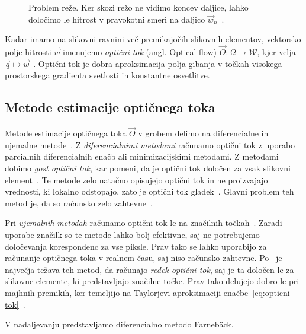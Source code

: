 \begin{figure}[htb]
\centering

\caption[Problem reže]{Problem reže. Ker skozi režo ne vidimo koncev daljice, lahko določimo le hitrost v pravokotni smeri na daljico $\vec{w}_n$~\cite{trucco1998introductory}.}
\label{fig:aperture-problem}
\end{figure}




Kadar imamo na slikovni ravnini več premikajočih slikovnih elementov, vektorsko polje hitrosti $\vec{w}$ imenujemo \emph{optični tok} (angl. Optical flow) $\vec{O}: \varOmega \to \mathcal{W}$, kjer velja $ \vec{q} \mapsto \vec{w}$~\cite{trucco1998introductory}. Optični tok je dobra aproksimacija polja gibanja v točkah visokega prostorskega gradienta svetlosti in konstantne osvetlitve.



\subsection{Metode estimacije optičnega toka}\label{sec:metode-of}

Metode estimacije optičnega toka $\vec{O}$ v grobem delimo na diferencialne in {ujemalne} metode~\cite{trucco1998introductory}. Z \emph{diferencialnimi metodami} računamo optični tok z uporabo parcialnih diferencialnih enačb ali minimizacijskimi metodami. Z metodami dobimo \emph{gost optični tok}, kar pomeni, da je optični tok določen za vsak slikovni element~\cite{trucco1998introductory}. Te metode zelo natačno opisujejo optični tok in ne proizvajajo vrednosti, ki lokalno odstopajo, zato je optični tok gladek~\cite{brox2011large}.  Glavni problem teh metod je, da so računsko zelo zahtevne~\cite{trucco1998introductory}.

Pri \emph{ujemalnih metodah} računamo optični tok le na značilnih točkah~\cite{trucco1998introductory}. Zaradi uporabe značilk so te metode lahko bolj efektivne, saj ne potrebujemo določevanja korespondenc za vse piksle. Prav tako se lahko uporabijo za računanje optičnega toka v realnem času, saj niso računsko zahtevne. Po~\cite{trucco1998introductory} je največja težava teh metod, da računajo \emph{redek optični tok}, saj je ta določen le za slikovne elemente, ki predstavljajo značilne točke. Prav tako delujejo dobro le pri majhnih premikih, ker temeljijo na Taylorjevi aproksimaciji enačbe~\eqref{eq:opticni-tok}~\cite{wedel2011stereo}. 

V nadaljevanju predstavljamo diferencialno metodo Farneb{\"a}ck.


